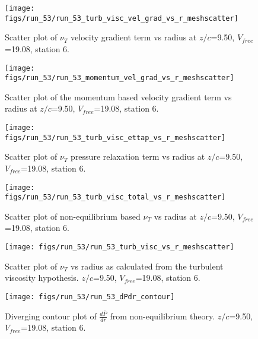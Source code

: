 \begin{figure}[H]
\centering
\texttt{[image: figs/run\_53/run\_53\_turb\_visc\_vel\_grad\_vs\_r\_meshscatter]}
\caption{Scatter plot of $\nu_T$ velocity gradient term vs radius at $z/c$=9.50, $V_{free}$=19.08, station 6.}
\end{figure}


\begin{figure}[H]
\centering
\texttt{[image: figs/run\_53/run\_53\_momentum\_vel\_grad\_vs\_r\_meshscatter]}
\caption{Scatter plot of the momentum based velocity gradient term vs radius at $z/c$=9.50, $V_{free}$=19.08, station 6.}
\end{figure}


\begin{figure}[H]
\centering
\texttt{[image: figs/run\_53/run\_53\_turb\_visc\_ettap\_vs\_r\_meshscatter]}
\caption{Scatter plot of $\nu_T$ pressure relaxation term vs radius at $z/c$=9.50, $V_{free}$=19.08, station 6.}
\end{figure}


\begin{figure}[H]
\centering
\texttt{[image: figs/run\_53/run\_53\_turb\_visc\_total\_vs\_r\_meshscatter]}
\caption{Scatter plot of non-equilibrium based $\nu_T$ vs radius at $z/c$=9.50, $V_{free}$=19.08, station 6.}
\end{figure}


\begin{figure}[H]
\centering
\texttt{[image: figs/run\_53/run\_53\_turb\_visc\_vs\_r\_meshscatter]}
\caption{Scatter plot of $\nu_T$ vs radius as calculated from the turbulent viscosity hypothesis. $z/c$=9.50, $V_{free}$=19.08, station 6.}
\end{figure}


\begin{figure}[H]
\centering
\texttt{[image: figs/run\_53/run\_53\_dPdr\_contour]}
\caption{Diverging contour plot of $\frac{d\bar{P}}{dr}$ from non-equilibrium theory. $z/c$=9.50, $V_{free}$=19.08, station 6.}
\end{figure}


